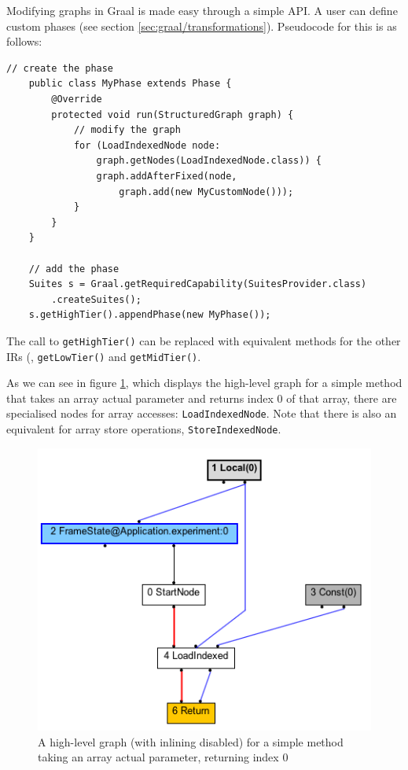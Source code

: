 	Modifying graphs in Graal is made easy through a simple API. A user can define custom phases (see section \ref{sec:graal/transformations}). Pseudocode for this is as follows:
	
	\begin{lstlisting}[caption=Sample code for adding a phase and manipulating a graph,label=list:graph-trans]
	// create the phase
	public class MyPhase extends Phase {
	    @Override
	    protected void run(StructuredGraph graph) {
	        // modify the graph
	        for (LoadIndexedNode node:
	            graph.getNodes(LoadIndexedNode.class)) {
	            graph.addAfterFixed(node,
	                graph.add(new MyCustomNode()));
	        }
	    }
	}
	
	// add the phase
	Suites s = Graal.getRequiredCapability(SuitesProvider.class)
	    .createSuites();
	s.getHighTier().appendPhase(new MyPhase());
	\end{lstlisting}
	
	The call to \texttt{getHighTier()} can be replaced with equivalent methods for the other IRs (\ie, \texttt{getLowTier()} and \texttt{getMidTier()}.
	
	As we can see in figure \ref{fig:access-index}, which displays the high-level graph for a simple method that takes an array actual parameter and returns index $0$ of that array, there are specialised nodes for array accesses: \texttt{LoadIndexedNode}. Note that there is also an equivalent for array store operations, \texttt{StoreIndexedNode}.
	
	\begin{figure}[h]
		\centering
		\includegraphics[width=.7\textwidth]{graphics/access-index.png}
		\caption{A high-level graph (with inlining disabled) for a simple method taking an array actual parameter, returning index 0}
		\label{fig:access-index}
	\end{figure}
	
